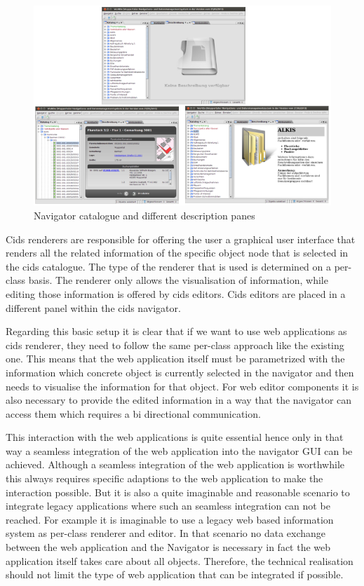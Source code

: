 \begin{figure}
	\centering \includegraphics[width=1.0\textwidth]{./img/conception/desc_panes.png}
	\caption{Navigator catalogue and different description panes}
	\label{fig:desc_panes}
\end{figure}

Cids renderers are responsible for offering the user a graphical user interface that renders all the related information of the specific object node that is selected in the cids catalogue.
The type of the renderer that is used is determined on a per-class basis.
The renderer only allows the visualisation of information, while editing those information is offered by cids editors.
Cids editors are placed in a different panel within the cids navigator.

Regarding this basic setup it is clear that if we want to use web applications as cids renderer, they need to follow the same per-class approach like the existing one.
This means that the web application itself must be parametrized with the information which concrete object is currently selected in the navigator and then needs to visualise the information for that object.
For web editor components it is also necessary to provide the edited information in a way that the navigator can access them which requires a bi directional communication.

This interaction with the web applications is quite essential hence only in that way a seamless integration of the web application into the navigator GUI can be achieved.
Although a seamless integration of the web application is worthwhile this always requires specific adaptions to the web application to make the interaction possible.
But it is also a quite imaginable and reasonable scenario to integrate legacy applications where such an seamless integration can not be reached.
For example it is imaginable to use a legacy web based information system as per-class renderer and editor.
In that scenario no data exchange between the web application and the Navigator is necessary in fact the web application itself takes care about all objects.
Therefore, the technical realisation should not limit the type of web application that can be integrated if possible.


